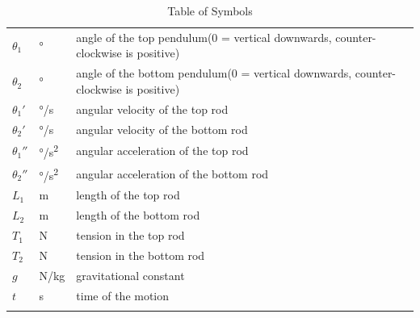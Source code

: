 \documentclass[12pt]{article}
\begin{document}
\begin{table}[H]
\begin{longtable*}{l l p{12cm}}
  \\
  $\theta_1$ & \si[per-mode=symbol] {\degree} & angle of the top pendulum(0 = vertical downwards, counter-clockwise is positive)
  \\
  $\theta_2$ & \si[per-mode=symbol] {\degree} & angle of the bottom pendulum(0 = vertical downwards, counter-clockwise is positive)
  \\ 
  ${\theta_1}'$ & \si[per-mode=symbol] {\degree\per\second} & angular velocity of the top rod
  \\
  ${\theta_2}'$ & \si[per-mode=symbol] {\degree\per\second} & angular velocity of the bottom rod
  \\
  ${\theta_1}''$ & \si[per-mode=symbol] {\degree\per\square\second} & angular acceleration of the top rod
  \\
  ${\theta_2}''$ & \si[per-mode=symbol] {\degree\per\square\second} & angular acceleration of the bottom rod
  \\
  $L_1$ & \si[per-mode=symbol] {\metre} & length of the top rod
  \\
  $L_2$ & \si[per-mode=symbol] {\metre} & length of the bottom rod
  \\
  $T_1$ & \si[per-mode=symbol] {\newton} & tension in the top rod
  \\
  $T_2$ & \si[per-mode=symbol] {\newton} & tension in the bottom rod
  \\
  $g$ & \si[per-mode=symbol] {\newton\per\kilogram} & gravitational constant
  \\
  $t$ &  \si[per-mode=symbol] {\second}  & time of the motion
  \\
  \bottomrule\\
  \end{longtable*}
  \caption{Table of Symbols} 
\end{table}
~\newline
\end{document}
